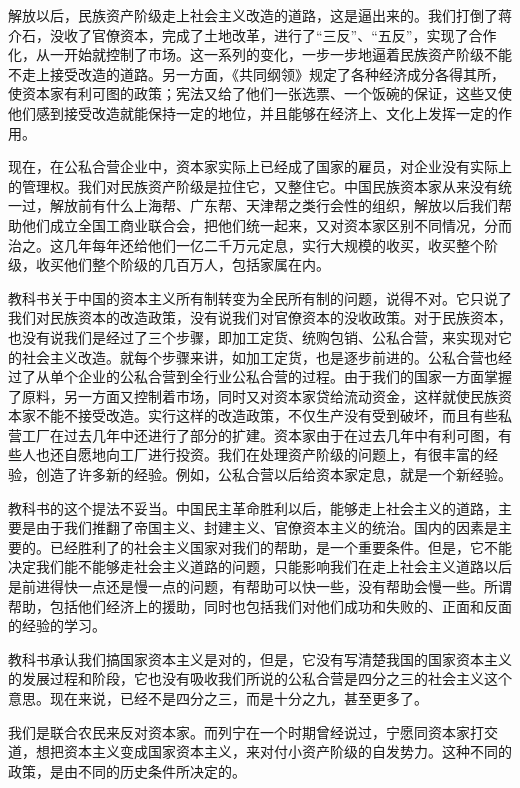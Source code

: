 解放以后，民族资产阶级走上社会主义改造的道路，这是逼出来的。我们打倒了蒋介石，没收了官僚资本，完成了土地改革，进行了“三反”、“五反”，实现了合作化，从一开始就控制了市场。这一系列的变化，一步一步地逼着民族资产阶级不能不走上接受改造的道路。另一方面，《共同纲领》规定了各种经济成分各得其所，使资本家有利可图的政策；宪法又给了他们一张选票、一个饭碗的保证，这些又使他们感到接受改造就能保持一定的地位，并且能够在经济上、文化上发挥一定的作用。

现在，在公私合营企业中，资本家实际上已经成了国家的雇员，对企业没有实际上的管理权。我们对民族资产阶级是拉住它，又整住它。中国民族资本家从来没有统一过，解放前有什么上海帮、广东帮、天津帮之类行会性的组织，解放以后我们帮助他们成立全国工商业联合会，把他们统一起来，又对资本家区别不同情况，分而治之。这几年每年还给他们一亿二千万元定息，实行大规模的收买，收买整个阶级，收买他们整个阶级的几百万人，包括家属在内。

教科书关于中国的资本主义所有制转变为全民所有制的问题，说得不对。它只说了我们对民族资本的改造政策，没有说我们对官僚资本的没收政策。对于民族资本，也没有说我们是经过了三个步骤，即加工定货、统购包销、公私合营，来实现对它的社会主义改造。就每个步骤来讲，如加工定货，也是逐步前进的。公私合营也经过了从单个企业的公私合营到全行业公私合营的过程。由于我们的国家一方面掌握了原料，另一方面又控制着市场，同时又对资本家贷给流动资金，这样就使民族资本家不能不接受改造。实行这样的改造政策，不仅生产没有受到破坏，而且有些私营工厂在过去几年中还进行了部分的扩建。资本家由于在过去几年中有利可图，有些人也还自愿地向工厂进行投资。我们在处理资产阶级的问题上，有很丰富的经验，创造了许多新的经验。例如，公私合营以后给资本家定息，就是一个新经验。

教科书的这个提法不妥当。中国民主革命胜利以后，能够走上社会主义的道路，主要是由于我们推翻了帝国主义、封建主义、官僚资本主义的统治。国内的因素是主要的。已经胜利了的社会主义国家对我们的帮助，是一个重要条件。但是，它不能决定我们能不能够走社会主义道路的问题，只能影响我们在走上社会主义道路以后是前进得快一点还是慢一点的问题，有帮助可以快一些，没有帮助会慢一些。所谓帮助，包括他们经济上的援助，同时也包括我们对他们成功和失败的、正面和反面的经验的学习。

教科书承认我们搞国家资本主义是对的，但是，它没有写清楚我国的国家资本主义的发展过程和阶段，它也没有吸收我们所说的公私合营是四分之三的社会主义这个意思。现在来说，已经不是四分之三，而是十分之九，甚至更多了。

我们是联合农民来反对资本家。而列宁在一个时期曾经说过，宁愿同资本家打交道，想把资本主义变成国家资本主义，来对付小资产阶级的自发势力。这种不同的政策，是由不同的历史条件所决定的。

